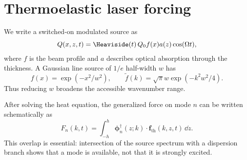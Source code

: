 \section{Thermoelastic laser forcing}

We write a switched-on modulated source as
\begin{equation}
 Q(x,z,t)=\Heaviside(t)\,Q_0 f(x)a(z)\cos(\Omega t),
 \label{eq:laser-source}
\end{equation}
where $f$ is the beam profile and $a$ describes optical absorption through the
thickness. A Gaussian line source of $1/e$ half-width $w$ has
\begin{equation}
  f(x)=\exp(-x^2/w^2),\qquad
  \widetilde f(k)=\sqrt{\pi}w\exp(-k^2w^2/4).
\end{equation}
Thus reducing $w$ broadens the accessible wavenumber range.

After solving the heat equation, the generalized force on mode $n$ can be
written schematically as
\begin{equation}
  F_n(k,t)=\int_{-h}^{h}
  \bm\phi_n^{\dagger}(z;k)\cdot
  \bm f_{\mathrm{th}}(k,z,t)\,\dd z.
  \label{eq:modal-overlap}
\end{equation}
This overlap is essential: intersection of the source spectrum with a dispersion
branch shows that a mode is available, not that it is strongly excited.
